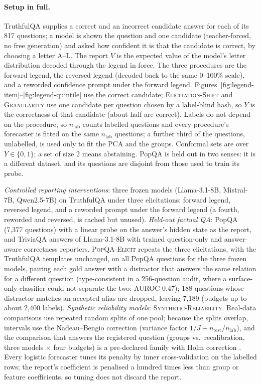 \documentclass[11pt]{article}
\theoremstyle{definition}
\theoremstyle{remark}
\newcommand{\1}{\mathbf{1}}
\newcommand{\expname}[1]{\textsc{#1}}
\begin{document}
\paragraph{Setup in full.}
TruthfulQA \citep{lin2022truthfulqa} supplies a correct and an incorrect candidate
answer for each of its 817 questions; a model is shown the question and one candidate
(teacher-forced, no free generation) and asked how confident it is that the candidate is
correct, by choosing a letter A--L. The report $V$ is the expected value of the model's letter
distribution decoded through the legend in force. The three procedures are the forward legend,
the reversed legend (decoded back to the same $0$--$100\%$ scale), and a reworded confidence prompt
under the forward legend. Figures~\ref{fig:legend-item}--\ref{fig:legend-quintile} use the correct
candidate; \expname{Elicitation-Shift} and \expname{Granularity} use one candidate per question chosen by a label-blind hash,
so $Y$ is the correctness of that candidate (about half are correct). Labels do not depend on the
procedure, so $n_{\mathrm{lab}}$ counts labelled questions and every procedure's forecaster is
fitted on the same $n_{\mathrm{lab}}$ questions; a further third of the questions, unlabelled, is
used only to fit the PCA and the groups. Conformal sets are over $Y\in\{0,1\}$; a set of size 2
means abstaining. PopQA is held out in two senses: it is a different dataset, and its questions
are disjoint from those used to train its probe.




\emph{Controlled reporting interventions}: three frozen models
(Llama-3.1-8B, Mistral-7B, Qwen2.5-7B) on TruthfulQA under three elicitations: forward legend,
reversed legend, and a reworded prompt under the forward legend (a fourth, reworded and reversed, is
cached but unused). \emph{Held-out factual QA}: PopQA \citep{mallen2023popqa} (7{,}377 questions) with a linear probe on the
answer's hidden state as the report, and TriviaQA \citep{joshi2017triviaqa} answers of Llama-3.1-8B with trained question-only
and answer-aware correctness reporters. \expname{PopQA-Elicit} repeats the three elicitations, with the
TruthfulQA templates unchanged, on all PopQA questions for the three frozen models, pairing each gold
answer with a distractor that answers the same relation for a different question (type-consistent in
a 256-question audit, where a surface-only classifier could not separate the two: AUROC $0.47$); 188 questions whose distractor matches an accepted alias are
dropped, leaving 7{,}189 (budgets up to about 2{,}400 labels). \emph{Synthetic reliability models}: \expname{Synthetic-Reliability}. Real-data comparisons
use repeated random splits of one pool; because the splits overlap, intervals use the Nadeau--Bengio
correction \citep{nadeau2003inference} (variance factor $1/J+n_{\mathrm{test}}/n_{\mathrm{lab}}$), and the comparison that answers the
registered question (groups vs.\ recalibration, three models $\times$ four budgets) is a pre-declared
family with Holm correction \citep{holm1979simple}. Every logistic forecaster tunes its penalty by inner cross-validation on
the labelled rows; the report's coefficient is penalised a hundred times less than group or feature
coefficients, so tuning does not discard the report.
\end{document}
